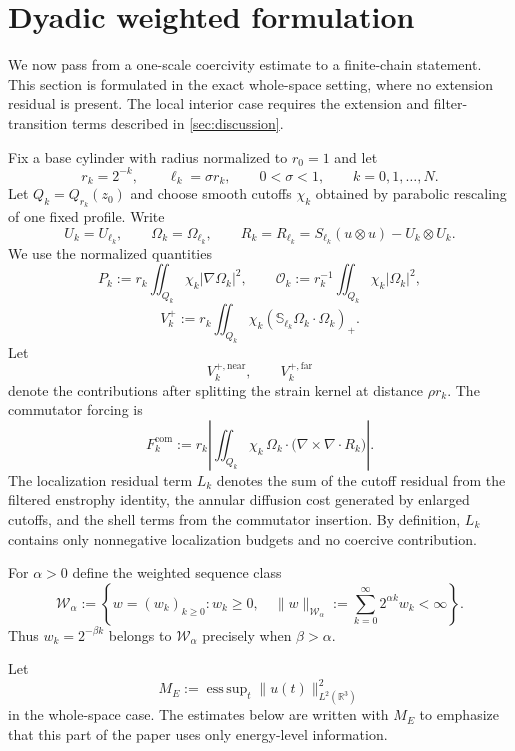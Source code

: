 \documentclass[11pt]{article}
\numberwithin{equation}{section}
\theoremstyle{plain}
\theoremstyle{definition}
\theoremstyle{remark}
\DeclareMathOperator*{\esssup}{ess\,sup}
\newcommand{\R}{\mathbb R}
\begin{document}
\section{Dyadic weighted formulation}\label{sec:dyadic}

We now pass from a one-scale coercivity estimate to a finite-chain statement.  This section is formulated in the exact whole-space setting, where no extension residual is present.  The local interior case requires the extension and filter-transition terms described in \cref{sec:discussion}.

Fix a base cylinder with radius normalized to $r_0=1$ and let
\[
r_k=2^{-k},\qquad \ell_k=\sigma r_k,
\qquad 0<\sigma<1,
\qquad k=0,1,\dots,N.
\]
Let $Q_k=Q_{r_k}(z_0)$ and choose smooth cutoffs $\chi_k$ obtained by parabolic rescaling of one fixed profile.  Write
\[
U_k=U_{\ell_k},\qquad
\Omega_k=\Omega_{\ell_k},\qquad
R_k=R_{\ell_k}=S_{\ell_k}(u\otimes u)-U_k\otimes U_k.
\]
We use the normalized quantities
\[
P_k:=r_k\iint_{Q_k}\chi_k|\nabla\Omega_k|^2,
\qquad
\mathcal O_k:=r_k^{-1}\iint_{Q_k}\chi_k|\Omega_k|^2,
\]
\[
V_k^+:=r_k\iint_{Q_k}\chi_k(\mathbb S_{\ell_k}\Omega_k\cdot\Omega_k)_+.
\]
Let
\[
V_k^{+,\mathrm{near}},\qquad V_k^{+,\mathrm{far}}
\]
denote the contributions after splitting the strain kernel at distance $\rho r_k$.  The commutator forcing is
\begin{equation}\label{eq:Fcomm-def}
F_k^{\mathrm{com}}
:=
r_k\left|
\iint_{Q_k}\chi_k\,
\Omega_k\cdot\bigl(\nabla\times\nabla\!\cdot R_k\bigr)
\right|.
\end{equation}
The localization residual term $L_k$ denotes the sum of the cutoff residual from the filtered enstrophy identity, the annular diffusion cost generated by enlarged cutoffs, and the shell terms from the commutator insertion.  By definition, $L_k$ contains only nonnegative localization budgets and no coercive contribution.

For $\alpha>0$ define the weighted sequence class
\begin{equation}\label{eq:Walpha-def}
\mathcal W_\alpha
:=
\left\{w=(w_k)_{k\ge0}: w_k\ge0,
\quad
\|w\|_{\mathcal W_\alpha}:=
\sum_{k=0}^{\infty}2^{\alpha k}w_k<\infty
\right\}.
\end{equation}
Thus $w_k=2^{-\beta k}$ belongs to $\mathcal W_\alpha$ precisely when $\beta>\alpha$.

Let
\begin{equation}\label{eq:ME-def}
M_E:=\esssup_{t}\|u(t)\|_{L^2(\R^3)}^2
\end{equation}
in the whole-space case.  The estimates below are written with $M_E$ to emphasize that this part of the paper uses only energy-level information.
\end{document}
